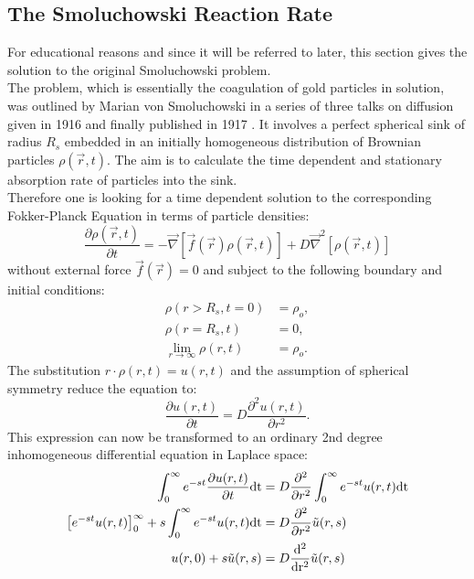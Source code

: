 \subsection{The Smoluchowski Reaction Rate}
For educational reasons and since it will be referred to later, this section gives the solution to the original Smoluchowski problem. \\
The problem, which is essentially the coagulation of gold particles in solution, was outlined by Marian von Smoluchowski in a series of three talks on diffusion given in 1916 \cite{Smoluchowski1916} and finally published in 1917 \cite{Smoluchowski1917a}. It involves a perfect spherical sink of radius $R_s$ embedded in an initially homogeneous distribution of Brownian particles $\rho(\vec{r},t)$. The aim is to calculate the time dependent and stationary absorption rate of particles into the sink. \\
Therefore one is looking for a time dependent solution to the corresponding Fokker-Planck Equation in terms of particle densities:
\begin{equation}
        \frac{\partial \rho(\vec{r},t)}{\partial t} = - \vec \nabla \left[ \vec f(\vec{r})\rho(\vec{r},t) \right] + D\vec \nabla ^2 \left[\rho(\vec{r},t) \right] 
    \label{FPE3}
\end{equation}
without external force $\vec{f}(\vec{r})=0$ and subject to the following boundary and initial conditions:
\begin{align}
    \rho(r > R_s, t = 0) &= \rho_o, \\
    \rho(r=R_s,t) &= 0, \\
    \lim_{r \rightarrow \infty} \rho(r, t) &= \rho_o.
    \label{BC}
\end{align}
The substitution $r \cdot \rho(r,t) = u(r,t)$ and the assumption of spherical symmetry reduce the equation to:
\begin{equation}
    \frac{\partial u(r,t)}{\partial t} = D \frac{\partial ^2 u(r,t)}{\partial r^2}.
    \label{Simplified FPE}
\end{equation}
This expression can now be transformed to an ordinary 2nd degree inhomogeneous differential equation in Laplace space:
\begin{align}
    \int_0^\infty e^{-st}\frac{\partial u(r,t)}{\partial t} \rm{d} t &= D \frac{\partial ^2 }{\partial r^2} \int_0^\infty e^{-st} u(r,t) \rm{d} t \\
    \left[e^{-st} u(r,t) \right]_0^\infty + s \int_0^\infty e^{-st} u(r,t) \rm{d} t &= D \frac{\partial^2}{\partial r^2} \tilde{u}(r,s)\\
    u(r,0) + s \tilde{u}(r,s) &= D \frac{\rm{d}^2}{\rm{d} r^2} \tilde{u}(r,s)
\end{align}

